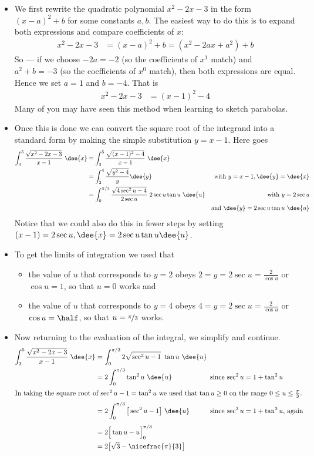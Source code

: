 \begin{eg}
\soln
\begin{itemize}
 \item  We first rewrite the quadratic polynomial $x^2-2x-3$ in the form $(x-a)^2+b$ for
some constants $a,b$. The easiest way to do this is to expand both expressions and
compare coefficients of $x$:
\begin{align*}
  x^2-2x-3 &= (x-a)^2+b = (x^2-2ax+a^2)+b
\end{align*}
So --- if we choose $-2a=-2$ (so the coefficients of $x^1$ match) and $a^2+b=-3$ (so the
coefficients of $x^0$ match), then both expressions are equal. Hence we set $a=1$ and
$b=-4$. That is
\begin{align*}
x^2-2x-3 &= (x-1)^2-4
\end{align*}
Many of you may have seen this method when learning to sketch parabolas.
\item Once this is done we can convert the square root of the integrand into a standard
form by making the simple substitution $y=x-1$. Here goes
\begin{align*}
\int_3^5\frac{\sqrt{x^2-2x-3}}{x-1}\ \dee{x}
&=\int_3^5\frac{\sqrt{(x-1)^2-4}}{x-1}\ \dee{x} \\
&=\int_2^4\frac{\sqrt{y^2-4}}{y}\dee{y}
&\text{with $y=x-1, \dee{y} = \dee{x}$}\\
&=\int_0^{\pi/3}\frac{\sqrt{4\sec^2u-4}}{2\sec u}\ 2\sec u\tan u\ \dee{u}
&\text{with $y=2\sec u$}\\
&& \text{and $\dee{y} = 2\sec u\tan u\ \dee{u}$}
\end{align*}
Notice that we could also do this in fewer steps by setting $(x-1)=2\sec u,
\dee{x}=2\sec u\tan u\dee{u}$.
\item
To get the limits of integration we used that
\begin{itemize}
\item the value of $u$ that corresponds to $y=2$ obeys
  $2=y=2\sec u=\frac{2}{\cos u}$ or $\cos u=1$, so that $u=0$ works and
\item the value of $u$ that corresponds to $y=4$ obeys
  $4=y=2\sec u=\frac{2}{\cos u}$ or $\cos u=\half$, so that
  $u=\nicefrac{\pi}{3}$ works.
\end{itemize}
\item Now returning to the evaluation of the integral, we simplify and
continue.
\begin{align*}
\int_3^5\frac{\sqrt{x^2-2x-3}}{x-1}\ \dee{x}
&=\int_0^{\pi/3} 2\sqrt{\sec^2 u -1}\ \tan u\ \dee{u} \hidewidth\\
&=2\int_0^{\pi/3} \tan^2 u\ \dee{u}
&&\qquad\text{since $\sec^2u=1+\tan^2u$}\\
\intertext{In taking the square root of $\sec^2u-1=\tan^2u$ we used that $\tan u\ge 0$ on
the range $0\le u\le \frac{\pi}{3}$.}
&=2\int_0^{\pi/3}\big[ \sec^2 u-1\big]\ \dee{u}
&&\qquad\text{since $\sec^2u=1+\tan^2u$, again}\\[0.05in]
&=2\Big[\tan u - u\Big]_0^{\pi/3} \\
&=2\big[\sqrt{3}-\nicefrac{\pi}{3}\big]
\end{align*}
\end{itemize}

\end{eg}


